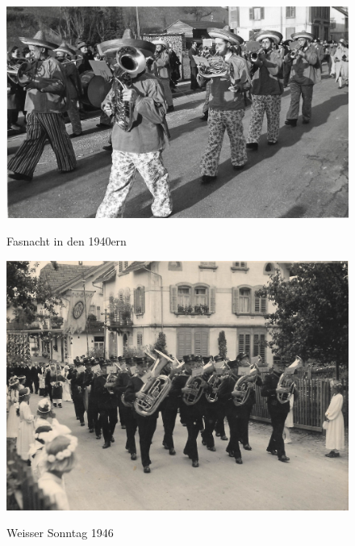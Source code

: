 \documentclass[openany]{book}
\begin{document}
\begin{figure}[h]
    \centering
    \includegraphics{./chap/1925-1950/Fasnacht-1946.jpg}
    \label{fig:mgh-fasnacht-1940}
    \caption{Fasnacht in den 1940ern}
\end{figure}
\begin{figure}[h]
    \centering
    \includegraphics{./chap/1925-1950/Weisser-Sontag-1946.jpg}
    \label{fig:mgh-weisssontag-prozession}
    \caption{Weisser Sonntag 1946}
\end{figure}
\clearpage
\end{document}
